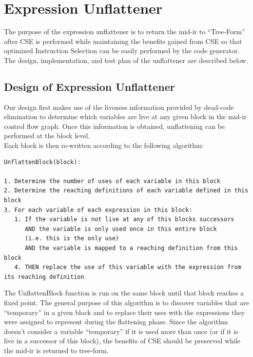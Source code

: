 \documentclass[11pt]{article}
\begin{document}
\section {Expression Unflattener}
\label{sec:unflat}

The purpose of the expression unflattener is to return the mid-ir to
``Tree-Form'' after CSE is performed while maintaining the benefits
gained from CSE so that optimized Instruction Selection can be easily
performed by the code generator. The design, implementation, and test
plan of the unflattener are described below.

\subsection{Design of Expression Unflattener}

Our design first makes use of the liveness information
provided by dead-code elimination to determine which variables are
live at any given block in the mid-ir control flow graph. Once this
information is obtained, unflattening can be performed at the block
level.\\


\noindent Each block is then re-written according to the following algorithm: 

\begin{verbatim}
UnflattenBlock(block):

1. Determine the number of uses of each variable in this block 
2. Determine the reaching definitions of each variable defined in this
block
3. For each variable of each expression in this block: 
   1. If the variable is not live at any of this blocks successors 
      AND the variable is only used once in this entire block 
      (i.e. this is the only use)
      AND the variable is mapped to a reaching definition from this block 
   4. THEN replace the use of this variable with the expression from
its reaching definition
\end{verbatim}

\noindent The UnflattenBlock function is run on the same block until that block
reaches a fixed point. The general purpose of this algorithm is to
discover variables that are ``temporary'' in a given block and to replace
their uses with the expressions they were assigned to represent during
the flattening phase. Since the algorithm doesn't consider a variable
``temporary'' if it is used more than once (or if it is live in a
successor of this block), the benefits of CSE should be preserved
while the mid-ir is returned to tree-form. 
\end{document}
